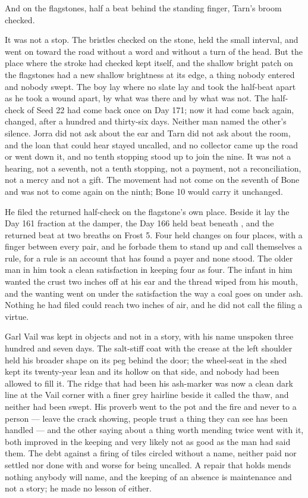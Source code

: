 And on the flagstones, half a beat behind the standing finger, Tarn's broom checked.

It was not a stop. The bristles checked on the stone, held the small interval, and went on toward the road without a word and without a turn of the head. But the place where the stroke had checked kept itself, and the shallow bright patch on the flagstones had a new shallow brightness at its edge, a thing nobody entered and nobody swept. The boy lay where no slate lay and took the half-beat apart as he took a wound apart, by what was there and by what was not. The half-check of Seed 22 had come back once on Day 171; now it had come back again, changed, after a hundred and thirty-six days. Neither man named the other's silence. Jorra did not ask about the ear and Tarn did not ask about the room, and the loan that could hear stayed uncalled, and no collector came up the road or went down it, and no tenth stopping stood up to join the nine. It was not a hearing, not a seventh, not a tenth stopping, not a payment, not a reconciliation, not a mercy and not a gift. The movement had not come on the seventh of Bone and was not to come again on the ninth; Bone 10 would carry it unchanged.

He filed the returned half-check on the flagstone's own place. Beside it lay the Day 161 fraction at the damper, the Day 166 held beat beneath , and the returned beat at two breaths on Frost 5. Four held changes on four places, with a finger between every pair, and he forbade them to stand up and call themselves a rule, for a rule is an account that has found a payer and none stood. The older man in him took a clean satisfaction in keeping four as four. The infant in him wanted the crust two inches off at his ear and the thread wiped from his mouth, and the wanting went on under the satisfaction the way a coal goes on under ash. Nothing he had filed could reach two inches of air, and he did not call the filing a virtue.

\scenebreak

Garl Vail was kept in objects and not in a story, with his name unspoken three hundred and seven days. The salt-stiff coat with the crease at the left shoulder held his broader shape on its peg behind the door; the wheel-seat in the shed kept its twenty-year lean and its hollow on that side, and nobody had been allowed to fill it. The ridge that had been his ash-marker was now a clean dark line at the Vail corner with a finer grey hairline beside it called the thaw, and neither had been swept. His proverb went to the pot and the fire and never to a person --- leave the crack showing, people trust a thing they can see has been handled --- and the other saying about a thing worth mending twice went with it, both improved in the keeping and very likely not as good as the man had said them. The debt against a firing of tiles circled without a name, neither paid nor settled nor done with and worse for being uncalled. A repair that holds mends nothing anybody will name, and the keeping of an absence is maintenance and not a story; he made no lesson of either.


